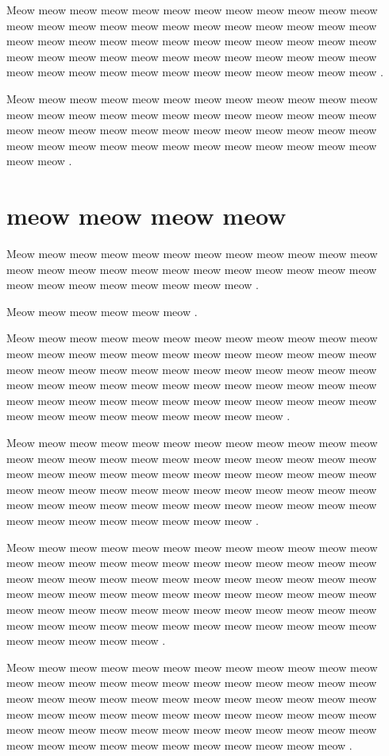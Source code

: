 \documentclass[12pt, a5paper, openany]{book}
\begin{document}
Meow meow meow meow meow meow meow meow meow meow meow meow meow meow meow meow meow meow meow meow meow meow meow meow meow meow meow meow meow meow meow meow meow meow meow meow meow meow meow meow meow meow meow meow meow meow meow meow meow meow meow meow meow meow meow meow meow meow meow meow .

Meow meow meow meow meow meow meow meow meow meow meow meow meow meow meow meow meow meow meow meow meow meow meow meow meow meow meow meow meow meow meow meow meow meow meow meow meow meow meow meow meow meow meow meow meow meow meow meow meow meow .



\chapter{meow meow meow meow }Meow meow meow meow meow meow meow meow meow meow meow meow meow meow meow meow meow meow meow meow meow meow meow meow meow meow meow meow meow meow meow meow .

Meow meow meow meow meow meow .

Meow meow meow meow meow meow meow meow meow meow meow meow meow meow meow meow meow meow meow meow meow meow meow meow meow meow meow meow meow meow meow meow meow meow meow meow meow meow meow meow meow meow meow meow meow meow meow meow meow meow meow meow meow meow meow meow meow meow meow meow meow meow meow meow meow meow meow meow meow .

Meow meow meow meow meow meow meow meow meow meow meow meow meow meow meow meow meow meow meow meow meow meow meow meow meow meow meow meow meow meow meow meow meow meow meow meow meow meow meow meow meow meow meow meow meow meow meow meow meow meow meow meow meow meow meow meow meow meow meow meow meow meow meow meow meow meow meow meow .

Meow meow meow meow meow meow meow meow meow meow meow meow meow meow meow meow meow meow meow meow meow meow meow meow meow meow meow meow meow meow meow meow meow meow meow meow meow meow meow meow meow meow meow meow meow meow meow meow meow meow meow meow meow meow meow meow meow meow meow meow meow meow meow meow meow meow meow meow meow meow meow meow meow meow meow meow meow .

Meow meow meow meow meow meow meow meow meow meow meow meow meow meow meow meow meow meow meow meow meow meow meow meow meow meow meow meow meow meow meow meow meow meow meow meow meow meow meow meow meow meow meow meow meow meow meow meow meow meow meow meow meow meow meow meow meow meow meow meow meow meow meow meow meow meow meow meow meow meow meow .
\end{document}

